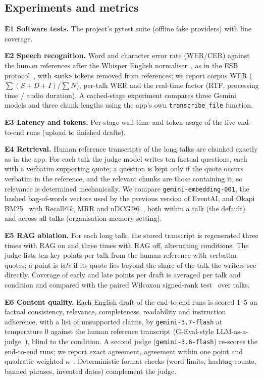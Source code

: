\subsection{Experiments and metrics}
\textbf{E1 Software tests.} The project's pytest suite (offline fake providers) with line
coverage.

\textbf{E2 Speech recognition.} Word and character error rate (WER/CER) against the human
references after the Whisper English normaliser~\cite{radford2023whisper}, as in the ESB
protocol~\cite{gandhi2022esb}, with \texttt{<unk>} tokens removed from references; we report
corpus WER ($\sum (S{+}D{+}I)/\sum N$), per-talk WER and the real-time factor (RTF,
processing time / audio duration). A cached-stage experiment compares three Gemini models
and three chunk lengths using the app's own \texttt{transcribe\_file} function.

\textbf{E3 Latency and tokens.} Per-stage wall time and token usage of the \DatasetTalks{}
live end-to-end runs (upload to finished drafts).

\textbf{E4 Retrieval.} Human reference transcripts of the \DatasetLong{} long talks are
chunked exactly as in the app. For each talk the judge model writes ten factual questions,
each with a verbatim supporting quote; a question is kept only if the quote occurs verbatim
in the reference, and the relevant chunks are those containing it, so relevance is
determined mechanically. We compare \texttt{gemini-embedding-001}, the hashed bag-of-words
vectors used by the previous version of EventAI, and Okapi BM25~\cite{robertson2009bm25}
with Recall@$k$, MRR and nDCG@6~\cite{jarvelin2002ndcg}, both within a talk (the default)
and across all talks (organisation-memory setting).

\textbf{E5 RAG ablation.} For each long talk, the stored transcript is regenerated three
times with RAG on and three times with RAG off, alternating conditions. The judge lists ten
key points per talk from the human reference with verbatim quotes; a point is \emph{late} if
its quote lies beyond the share of the talk the writers see directly. Coverage of early and
late points per draft is averaged per talk and condition and compared with the paired
Wilcoxon signed-rank test~\cite{wilcoxon1945} over talks.

\textbf{E6 Content quality.} Each English draft of the end-to-end runs is scored 1--5 on
factual consistency, relevance, completeness, readability and instruction adherence, with
a list of unsupported claims, by \texttt{gemini-3.7-flash} at temperature 0 against the
human reference transcript (G-Eval-style LLM-as-a-judge~\cite{liu2023geval,zheng2023judging}),
blind to the condition. A second judge (\texttt{gemini-3.6-flash}) re-scores the end-to-end
runs; we report exact agreement, agreement within one point and quadratic weighted
$\kappa$~\cite{cohen1968kappa}. Deterministic format checks (word limits, hashtag counts,
banned phrases, invented dates) complement the judge.

